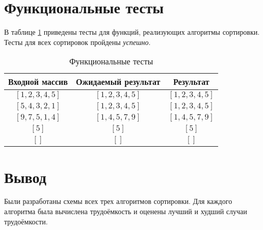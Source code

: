 \section{Функциональные тесты}

В таблице \ref{tbl:functional_test} приведены тесты для функций, реализующих алгоритмы сортировки. Тесты для всех сортировок пройдены \textit{успешно}.
\clearpage


\begin{table}[h]
	\begin{center}
		\begin{threeparttable}
		\captionsetup{justification=raggedleft,singlelinecheck=off}
		\caption{\label{tbl:functional_test} Функциональные тесты}
		\begin{tabular}{|c|c|c|}
			\hline
			Входной массив & Ожидаемый результат & Результат \\ 
			\hline
			$[1, 2, 3, 4, 5]$ & $[1, 2, 3, 4, 5]$  & $[1, 2, 3, 4, 5]$\\
			$[5, 4, 3, 2, 1]$  & $[1, 2, 3, 4, 5]$ & $[1, 2, 3, 4, 5]$\\
			$[9, 7, 5, 1, 4]$  & $[1, 4, 5, 7, 9]$  & $[1, 4, 5, 7, 9]$\\
			$[5]$  & $[5]$  & $[5]$\\
			$[]$  & $[]$  & $[]$\\
			\hline
		\end{tabular}
    \end{threeparttable}
	\end{center}
\end{table}


\section*{Вывод}

Были разработаны схемы всех трех алгоритмов сортировки. Для каждого алгоритма была вычислена трудоёмкость и оценены лучший и худший случаи трудоёмкости.
